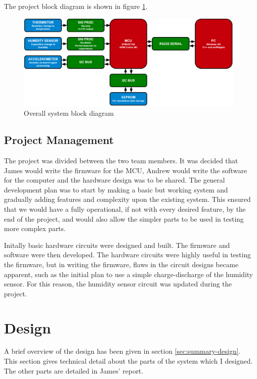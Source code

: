 \documentclass[a4paper,10pt]{article}  %
\begin{document}
The project block diagram is shown in figure \ref{fig:sysblkdgrm}.
\begin{figure}[htb]
  \begin{center}
    \includegraphics[width=1.0\textwidth]{System_diagram.png}
  \end{center}
  \caption{Overall system block diagram}
  \label{fig:sysblkdgrm}
\end{figure}

\subsection{Project Management}
\label{sec:project-management}

The project was divided between the two team members. It was decided
that James would write the firmware for the MCU, Andrew would write
the software for the computer and the hardware design was to be
shared. The general development plan was to start by making a basic
but working system and gradually adding features and complexity upon
the existing system. This ensured that we would have a fully
operational, if not with every desired feature, by the end of the
project, and would also allow the simpler parts to be used in testing
more complex parts.

Initally basic hardware circuits were designed and built. The firmware
and software were then developed. The hardware circuits were highly
useful in testing the firmware, but in writing the firmware, flaws in
the circuit designs became apparent, such as the initial plan to use a
simple charge-discharge of the humidity sensor. For this reason, the
humidity sensor circuit was updated during the project.

\section{Design}
\label{sec:design}

A brief overview of the design has been given in section
\ref{sec:summary-design}. This section gives technical detail about
the parts of the system which I designed. The other parts are detailed
in James' report.
\end{document}
